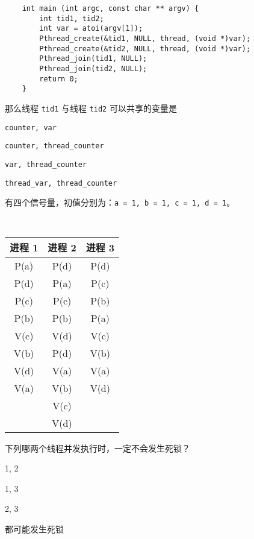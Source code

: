 \begin{problems}
\begin{verbatim}
    int main (int argc, const char ** argv) {
        int tid1, tid2;
        int var = atoi(argv[1]);
        Pthread_create(&tid1, NULL, thread, (void *)var);
        Pthread_create(&tid2, NULL, thread, (void *)var);
        Pthread_join(tid1, NULL);
        Pthread_join(tid2, NULL);
        return 0;
    }
        \end{verbatim}
        那么线程 \verb|tid1| 与线程 \verb|tid2| 可以共享的变量是
        \begin{choices}
            \item \verb|counter, var|
            \item \verb|counter, thread_counter|
            \item \verb|var, thread_counter|
            \item \verb|thread_var, thread_counter|
        \end{choices}
         有四个信号量，初值分别为：\verb|a = 1, b = 1, c = 1, d = 1|。
        \begin{table}[H]
            \tt
            \centering
            \begin{tabular}{|c|c|c|}
                \hline
                进程 1 & 进程 2 & 进程 3 \\ \hline
                P(a) & P(d) & P(d) \\
                P(d) & P(a) & P(c) \\
                P(c) & P(c) & P(b) \\
                P(b) & P(b) & P(a) \\
                V(c) & V(d) & V(c) \\
                V(b) & P(d) & V(b) \\
                V(d) & V(a) & V(a) \\
                V(a) & V(b) & V(d) \\
                & V(c) &  \\
                & V(d) &  \\ \hline
            \end{tabular}
        \end{table}
        下列哪两个线程并发执行时，一定不会发生死锁？
        \begin{choices}
            \item 1, 2
            \item 1, 3
            \item 2, 3
            \item 都可能发生死锁
        \end{choices}

\end{problems}
